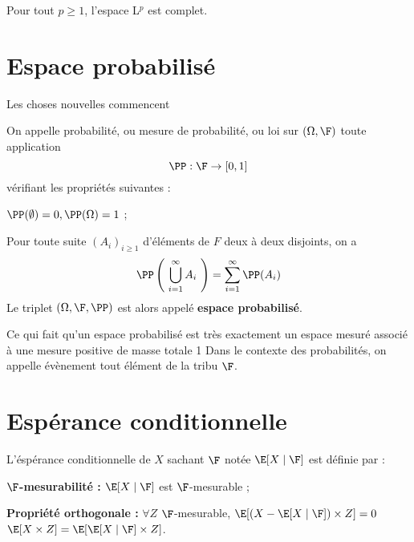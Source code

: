 \ep

\ep

\bp
Pour tout $p \geq 1$, l'espace L$^p$ est complet.
\ep


\section{Espace probabilisé}

Les choses nouvelles commencent 

\bigskip

On appelle probabilité, ou mesure de probabilité, ou loi sur $(\Omega, \F)$ toute application $$ \PP : \F \to [0,1]$$ vérifiant les propriétés suivantes : 
\ben
    \item $\PP(\emptyset) = 0, \PP(\Omega) = 1$ ;
    \item Pour toute suite $(A_i)_{i\geq 1}$ d'éléments de $F$ deux à deux disjoints, on a $$\PP \left( ~ \bigcup\limits_{i=1}^{\infty} A_i ~ \right) = \sum_{i=1}^{\infty} \PP(A_i)$$
\een
Le triplet $(\Omega, \F, \PP)$ est alors appelé \textbf{espace probabilisé}.

\bn 
Ce qui fait qu'un espace probabilisé est très exactement un espace mesuré associé à une mesure positive de masse totale 1 
\en
\bn
Dans le contexte des probabilités, on appelle évènement tout élément de la tribu $\F$.
\en
    
    
\section{Espérance conditionnelle}

L'éspérance conditionnelle de $X$ sachant $\F$ notée $\E[X \mid \F]$ est définie par :
\ben
    \item \textbf{$\F$-mesurabilité :} $\E[X\mid \F]$ est $\F$-mesurable ;
    \item \textbf{Propriété orthogonale :} $\forall Z$ $\F$-mesurable, $\E[(X - \E[X \mid \F])\times Z ] = 0$ \ssi $\E[X\times Z] = \E[\E[X\mid \F] \times Z]$.
\een
\ed

